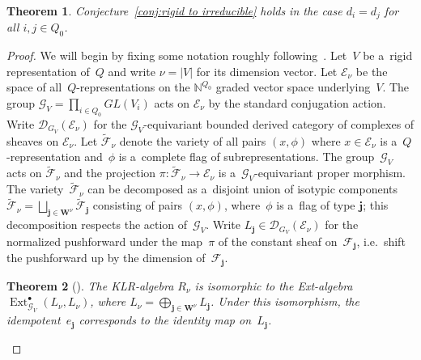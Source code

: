 \documentclass[pdftex]{sigma}
\numberwithin{equation}{section}
\newtheorem{Theorem}{Theorem}[section]
\begin{document}
\begin{Theorem}
\label{th:shuffle character is KLR character}
Conjecture~{\rm \ref{conj:rigid to irreducible}} holds in the case $d_i=d_j$ for all $i,j\in Q_0$.
\end{Theorem}
\begin{proof}
We will begin by f\/ixing some notation roughly following~\cite{varagnolo-vasserot}.
Let~$V$ be a~rigid representation of~$Q$ and write $\nu=|V|$ for its dimension vector.
Let $\mathcal{E}_\nu$ be the space of all~$Q$-representations on the $\mathbb{N}^{Q_0}$ graded vector space
underlying~$V$.
The group $\mathcal{G}_V=\prod\limits_{i\in Q_0} GL(V_i)$ acts on $\mathcal{E}_\nu$ by the standard conjugation action.
Write $\mathcal{D}_{G_V}(\mathcal{E}_\nu)$ for the $\mathcal{G}_V$-equivariant
bounded derived category of complexes of sheaves on $\mathcal{E}_\nu$.
Let $\widetilde{\mathcal{F}}_\nu$ denote the variety of all pairs $(x,\phi)$ where $x\in\mathcal{E}_\nu$
is a~$Q$-representation and~$\phi$ is a~complete f\/lag of subrepresentations.
The group~$\mathcal{G}_V$ acts on $\widetilde{\mathcal{F}}_\nu$ and the projection
$\pi:\widetilde{\mathcal{F}}_\nu\to\mathcal{E}_\nu$ is a~$\mathcal{G}_V$-equivariant proper morphism.
The va\-riety~$\widetilde{\mathcal{F}}_\nu$ can be decomposed as a~disjoint union of isotypic components
$\widetilde{\mathcal{F}}_\nu=\bigsqcup\limits_{\mathbf{j}\in\mathbf{W}^\nu} \widetilde{\mathcal{F}}_\mathbf{j}$ consisting
of pairs $(x,\phi)$, where~$\phi$ is a~f\/lag of type $\mathbf{j}$; this decomposition respects the action of~$\mathcal{G}_V$.
Write $L_\mathbf{j}\in\mathcal{D}_{G_V}(\mathcal{E}_\nu)$ for the normalized pushforward under the map~$\pi$ of the
constant sheaf on~$\mathcal{F}_\mathbf{j}$, i.e.~shift the pushforward up by the dimension of~$\mathcal{F}_\mathbf{j}$.

\begin{Theorem}[]
The KLR-algebra $R_\nu$ is isomorphic to the Ext-algebra\linebreak
$\operatorname{Ext}_{\mathcal{G}_V}^\bullet(L_\nu,L_\nu)$,
where $L_\nu=\bigoplus\limits_{\mathbf{j}\in\mathbf{W}^\nu}L_\mathbf{j}$.
Under this isomorphism, the idempotent~$e_\mathbf{j}$ corresponds to the identity map on~$L_\mathbf{j}$.
\end{Theorem}


\end{proof}
\end{document}

